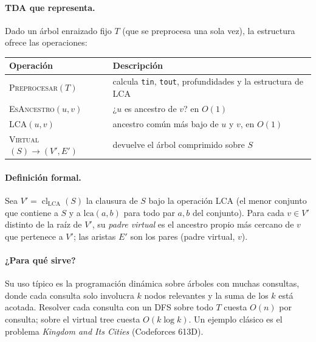 \documentclass[11pt,a4paper]{article}
\theoremstyle{plain}
\begin{document}
\paragraph{TDA que representa.} Dado un árbol enraizado fijo $T$ (que se preprocesa una
sola vez), la estructura ofrece las operaciones:
\begin{center}
\begin{tabular}{@{}ll@{}}
  \toprule
  \textbf{Operación} & \textbf{Descripción} \\
  \midrule
  \textsc{Preprocesar}$(T)$ & calcula \texttt{tin}, \texttt{tout}, profundidades y la estructura de LCA \\
  \textsc{EsAncestro}$(u, v)$ & ¿$u$ es ancestro de $v$? en $O(1)$ \\
  \textsc{LCA}$(u, v)$ & ancestro común más bajo de $u$ y $v$, en $O(1)$ \\
  \textsc{Virtual}$(S) \to (V', E')$ & devuelve el árbol comprimido sobre $S$ \\
  \bottomrule
\end{tabular}
\end{center}

\paragraph{Definición formal.} Sea $V' = \operatorname{cl}_{\mathrm{LCA}}(S)$ la clausura de
$S$ bajo la operación LCA (el menor conjunto que contiene a $S$ y a $\mathrm{lca}(a,b)$ para
todo par $a, b$ del conjunto). Para cada $v \in V'$ distinto de la raíz de $V'$, su
\emph{padre virtual} es el ancestro propio más cercano de $v$ que pertenece a $V'$; las
aristas $E'$ son los pares (padre virtual, $v$).

\paragraph{¿Para qué sirve?} Su uso típico es la programación dinámica sobre árboles con
muchas consultas, donde cada consulta solo involucra $k$ nodos relevantes y la suma de los
$k$ está acotada. Resolver cada consulta con un DFS sobre todo $T$ cuesta $O(n)$ por
consulta; sobre el virtual tree cuesta $O(k \log k)$. Un ejemplo clásico es el problema
\emph{Kingdom and Its Cities} (Codeforces 613D).
\end{document}
